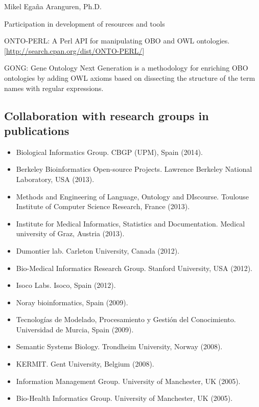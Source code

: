 \documentclass[english,11pt,a4paper,oneside]{article}
\begin{document}
\begin{cv}{Mikel Ega\~na Aranguren, Ph.D. }
\begin{cvlist}{Participation in development of resources and tools}
	\item [ONTO-PERL:] 
	A Perl API for manipulating OBO and OWL ontologies. [\href{http://search.cpan.org/dist/ONTO-PERL/}{http://search.cpan.org/dist/ONTO-PERL/}]

	\item [GONG:] 
	Gene Ontology Next Generation is a methodology for enriching OBO ontologies by adding OWL axioms based on dissecting the structure of the term names with regular expressions. 
	
\end{cvlist}

\subsection*{Collaboration with research groups in publications}
\begin{itemize}
	\item Biological Informatics Group. CBGP (UPM), Spain (2014). 
	\item Berkeley Bioinformatics Open-source Projects. Lawrence Berkeley National Laboratory, USA (2013).
	\item Methods and Engineering of Language, Ontology and DIscourse. Toulouse Institute of Computer Science Research, France (2013).
	\item Institute for Medical Informatics, Statistics and Documentation. Medical university of Graz, Austria (2013).
	\item Dumontier lab. Carleton University, Canada (2012).
	\item Bio-Medical Informatics Research Group. Stanford University, USA (2012).
	\item Isoco Labs. Isoco, Spain (2012).
	\item Noray bioinformatics, Spain (2009).
	\item Tecnolog\'ias de Modelado, Procesamiento y Gesti\'on del Conocimiento. Universidad de Murcia, Spain (2009).
	\item Semantic Systems Biology. Trondheim University, Norway (2008).
	\item KERMIT. Gent University, Belgium (2008).
	\item Information Management Group. University of Manchester, UK (2005).
	\item Bio-Health Informatics Group. University of Manchester, UK (2005).
\end{itemize}



\end{cv}
\end{document}
